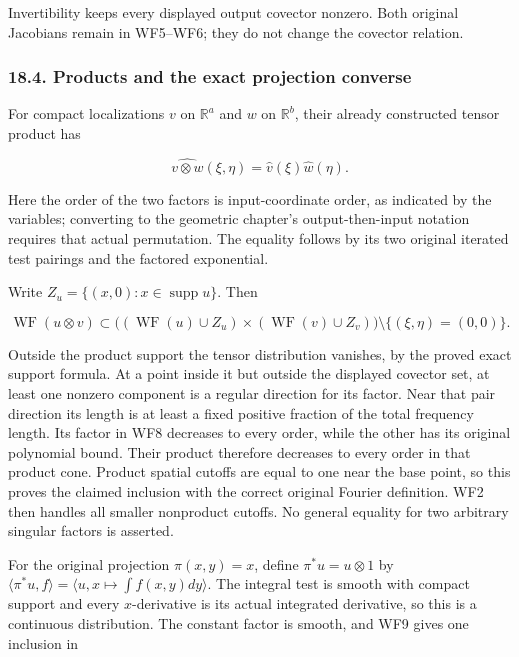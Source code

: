 \documentclass[
  11pt,
]{article}
\begin{document}
Invertibility keeps every displayed output covector nonzero. Both
original Jacobians remain in WF5--WF6; they do not change the covector
relation.

\subsubsection{18.4. Products and the exact projection
converse}\label{products-and-the-exact-projection-converse}

For compact localizations \(v\) on \(\mathbb R^a\) and \(w\) on
\(\mathbb R^b\), their already constructed tensor product has

\[
\widehat{v\otimes w}(\xi,\eta)=\widehat v(\xi)\widehat w(\eta).
\tag{WF8}
\]

Here the order of the two factors is input-coordinate order, as
indicated by the variables; converting to the geometric chapter's
output-then-input notation requires that actual permutation. The
equality follows by its two original iterated test pairings and the
factored exponential.

Write \(Z_u=\{(x,0):x\in\operatorname{supp}u\}\). Then

\[
\operatorname{WF}(u\otimes v)
\subset
\bigl((\operatorname{WF}(u)\cup Z_u)
      \times(\operatorname{WF}(v)\cup Z_v)\bigr)
          \setminus\{(\xi,\eta)=(0,0)\}.
\tag{WF9}
\]

Outside the product support the tensor distribution vanishes, by the
proved exact support formula. At a point inside it but outside the
displayed covector set, at least one nonzero component is a regular
direction for its factor. Near that pair direction its length is at
least a fixed positive fraction of the total frequency length. Its
factor in WF8 decreases to every order, while the other has its original
polynomial bound. Their product therefore decreases to every order in
that product cone. Product spatial cutoffs are equal to one near the
base point, so this proves the claimed inclusion with the correct
original Fourier definition. WF2 then handles all smaller nonproduct
cutoffs. No general equality for two arbitrary singular factors is
asserted.

For the original projection \(\pi(x,y)=x\), define \(\pi^*u=u\otimes1\)
by \(\langle\pi^*u,f\rangle=\langle u,x\mapsto\int f(x,y)dy\rangle\).
The integral test is smooth with compact support and every
\(x\)-derivative is its actual integrated derivative, so this is a
continuous distribution. The constant factor is smooth, and WF9 gives
one inclusion in
\end{document}
